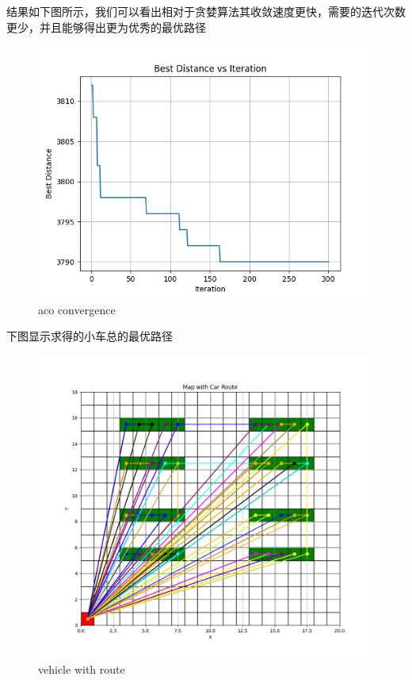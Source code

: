\documentclass[withoutpreface,bwprint]{thesis-config}
\begin{document}
\par 结果如下图所示，我们可以看出相对于贪婪算法其收敛速度更快，需要的迭代次数更少，并且能够得出更为优秀的最优路径
\newpage
\begin{figure}[!htbp]
    \centering
    \begin{minipage}[b]{0.7\linewidth}
        \centering
        \includegraphics[width=1\textwidth]{figures/aco_convergence.png}
        \caption{aco convergence}
    \end{minipage}
\end{figure}

\par 下图显示求得的小车总的最优路径

\begin{figure}[!htbp]
    \centering
    \begin{minipage}[b]{0.7\linewidth}
        \centering
        \includegraphics[width=1\textwidth]{figures/map_with_route.png}
        \caption{vehicle with route}
    \end{minipage}
\end{figure}
\end{document}
